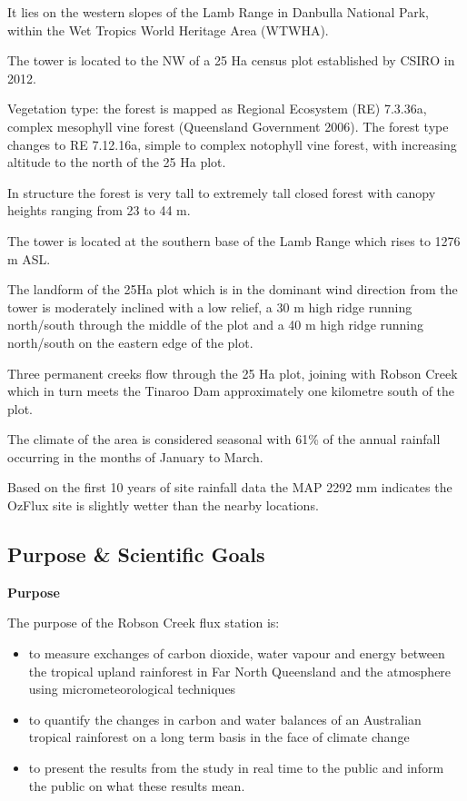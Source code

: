 \documentclass[11pt,a4paper]{article}
\begin{document}
It lies on the western slopes of the Lamb Range in Danbulla National Park, within the Wet Tropics World Heritage Area (WTWHA).

The tower is located to the NW of a 25 Ha census plot established by CSIRO in 2012.

Vegetation type: the forest is mapped as Regional Ecosystem (RE) 7.3.36a, complex mesophyll vine forest (Queensland Government 2006). The forest type changes to RE 7.12.16a, simple to complex notophyll vine forest, with increasing altitude to the north of the 25 Ha plot.

In structure the forest is very tall to extremely tall closed forest with canopy heights ranging from 23 to 44 m.

The tower is located at the southern base of the Lamb Range which rises to 1276 m ASL.

The landform of the 25Ha plot which is in the dominant wind direction from the tower is moderately inclined with a low relief, a 30 m high ridge running north/south through the middle of the plot and a 40 m high ridge running north/south on the eastern edge of the plot.

Three permanent creeks flow through the 25 Ha plot, joining with Robson Creek which in turn meets the Tinaroo Dam approximately one kilometre south of the plot.

The climate of the area is considered seasonal with 61\% of the annual rainfall occurring in the months of January to March.

Based on the first 10 years of site rainfall data the MAP 2292 mm indicates the OzFlux site is slightly wetter than the nearby locations.

\subsection*{Purpose \& Scientific Goals}

\textbf{Purpose}

The purpose of the Robson Creek flux station is:

\begin{itemize}
  \item to measure exchanges of carbon dioxide, water vapour and energy between the tropical upland rainforest in Far North Queensland and the atmosphere using micrometeorological techniques
  \item to quantify the changes in carbon and water balances of an Australian tropical rainforest on a long term basis in the face of climate change
  \item to present the results from the study in real time to the public and inform the public on what these results mean.
\end{itemize}
\end{document}
